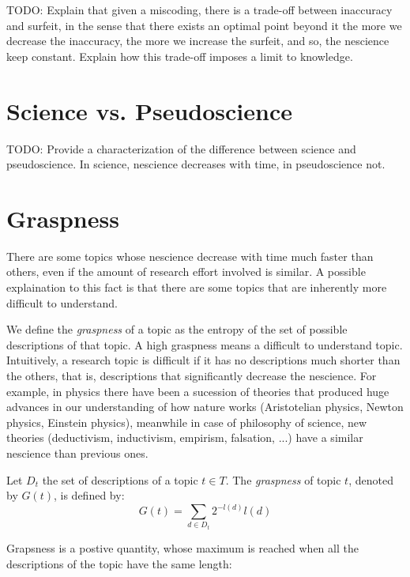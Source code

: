 {\color{red} TODO: Explain that given a miscoding, there is a trade-off between inaccuracy and surfeit, in the sense that there exists an optimal point beyond it the more we decrease the inaccuracy, the more we increase the surfeit, and so, the nescience keep constant. Explain how this trade-off imposes a limit to knowledge.}

%
%

\section{Science vs. Pseudoscience}

{\color{red} TODO: Provide a characterization of the difference between science and pseudoscience. In science, nescience decreases with time, in pseudoscience not.}

%
%
\section{Graspness}

There are some topics whose nescience decrease with time much faster than others, even if the amount of research effort involved is similar. A possible explaination to this fact is that there are some topics that are inherently more difficult to understand.

We define the \emph{graspness} of a topic as the entropy of the set of possible descriptions of that topic. A high graspness means a difficult to understand topic. Intuitively, a research topic is difficult if it has no descriptions much shorter than the others, that is, descriptions that significantly decrease the nescience. For example, in physics there have been a sucession of theories that produced huge advances in our understanding of how nature works (Aristotelian physics, Newton physics, Einstein physics), meanwhile in case of philosophy of science, new theories (deductivism, inductivism, empirism, falsation, ...) have a similar nescience than previous ones.

\begin{definition}[Graspness]
Let $D_t$ the set of descriptions of a topic $t \in T$. The \emph{graspness} of topic $t$, denoted by $G(t)$, is defined by:
\[
G(t) = \sum_{d \in D_t} 2^{-l(d)} l(d)
\]
\end{definition}

Grapsness is a postive quantity, whose maximum is reached when all the descriptions of the topic have the same length:

